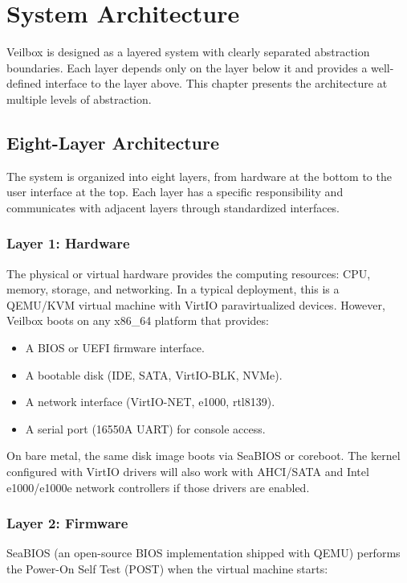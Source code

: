 \chapter{System Architecture}
\label{ch:arch}

Veilbox is designed as a layered system with clearly separated abstraction
boundaries. Each layer depends only on the layer below it and provides a
well-defined interface to the layer above. This chapter presents the
architecture at multiple levels of abstraction.

\section{Eight-Layer Architecture}

The system is organized into eight layers, from hardware at the bottom to
the user interface at the top. Each layer has a specific responsibility and
communicates with adjacent layers through standardized interfaces.

\subsection{Layer 1: Hardware}

The physical or virtual hardware provides the computing resources: CPU,
memory, storage, and networking. In a typical deployment, this is a QEMU/KVM
virtual machine with VirtIO paravirtualized devices. However, Veilbox boots
on any x86\_64 platform that provides:

\begin{itemize}[nosep]
  \item A BIOS or UEFI firmware interface.
  \item A bootable disk (IDE, SATA, VirtIO-BLK, NVMe).
  \item A network interface (VirtIO-NET, e1000, rtl8139).
  \item A serial port (16550A UART) for console access.
\end{itemize}

On bare metal, the same disk image boots via SeaBIOS or coreboot. The kernel
configured with VirtIO drivers will also work with AHCI/SATA and Intel
e1000/e1000e network controllers if those drivers are enabled.

\subsection{Layer 2: Firmware}

SeaBIOS (an open-source BIOS implementation shipped with QEMU) performs the
Power-On Self Test (POST) when the virtual machine starts:

